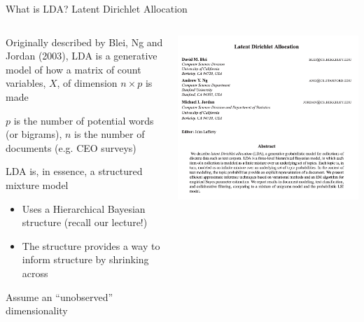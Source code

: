 \documentclass[notes,11pt, aspectratio=169]{beamer}
\newenvironment{wideitemize}{\itemize\addtolength{\itemsep}{10pt}}{\enditemize}
\begin{document}
  \begin{frame}{What is LDA? Latent Dirichlet Allocation}
    \begin{columns}[onlytextwidth, T] %
      \begin{column}{.5\textwidth}
        \begin{wideitemize}
        \item Originally described by Blei, Ng and Jordan (2003), LDA is a
          generative model of how a matrix of count variables, $X$, of
          dimension $n \times p$ is made
        \item $p$ is the number of potential words (or bigrams), $n$ is the
          number of documents (e.g. CEO surveys)
        \item LDA is, in essence, a structured mixture model
          \begin{itemize}
          \item Uses a Hierarchical Bayesian structure (recall our lecture!)
          \item The structure provides a way to inform structure by
            shrinking across
          \end{itemize}
        \item Assume an ``unobserved'' dimensionality 
        \end{wideitemize}
      \end{column}%
      \hfill%
      \begin{column}{.5\textwidth}
        \includegraphics[width=\linewidth]{images/blei_1.png}
      \end{column}%
    \end{columns}
  \end{frame}
\end{document}
